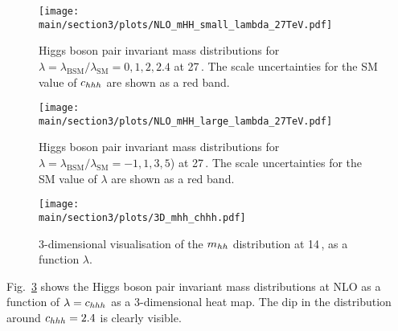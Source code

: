 \begin{figure}[htb]
  \centering
    \texttt{[image: \\main/section3/plots/NLO\_mHH\_small\_lambda\_27TeV.pdf]}
\caption{Higgs boson pair invariant mass distributions for $\lambda=\lambda_{\mathrm{BSM}}/\lambda_{\mathrm{SM}}=0,1,2,2.4$  at 27\,\UTeV. The scale uncertainties for the SM value of $c_{hhh}$ are shown as a red band.}
\label{fig:lambda_small_27}
\end{figure}

\begin{figure}[htb]
  \centering
    \texttt{[image: \\main/section3/plots/NLO\_mHH\_large\_lambda\_27TeV.pdf]}
\caption{Higgs boson pair invariant mass distributions for $\lambda=\lambda_{\mathrm{BSM}}/\lambda_{\mathrm{SM}}=-1,1,3,5$)  at 27\,\UTeV. The scale uncertainties for the SM value of $\lambda$ are shown as a red band.}
\label{fig:lambda_large_27}
\end{figure}

\begin{figure}[ht]
\begin{center}
  \texttt{[image: \\main/section3/plots/3D\_mhh\_chhh.pdf]}    
\end{center}
\caption{3-dimensional visualisation of the $m_{hh}$ distribution at
  14\,\UTeV, as a function  $\lambda$.}
\label{fig:chhh_3D}
\end{figure}
Fig.~\ref{fig:chhh_3D} shows the Higgs boson pair invariant mass
distributions at NLO as a function of $\lambda=c_{hhh}$  as a 3-dimensional heat map.
The dip in the distribution around $c_{hhh}=2.4$ is clearly visible.
 
%


